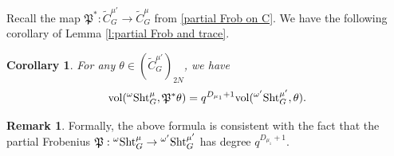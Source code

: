 \documentclass[reqno]{amsart}
\numberwithin{equation}{subsection}
\newtheorem{cor}[subsubsection]{Corollary}
\theoremstyle{definition}
\newtheorem{remark}[subsubsection]{Remark}
\newcommand\frP{\mathfrak{P}}
\newcommand\Sht{\textup{Sht}}
\newcommand{\vol}{\textup{vol}}
\newcommand{\wt}[1]{\widetilde{#1}}
\renewcommand{\th}{\theta}
\newcommand{\om}{\omega}
\begin{document}
Recall the map $\frP^*: \wt C^{\mu'}_G\to \wt C^\mu_G$ from \eqref{partial Frob on C}. 
We have the following corollary of Lemma \ref{l:partial Frob and trace}.

\begin{cor}\label{c:vol pullback partial Frob}
    For any $\th\in (\wt C^{\mu'}_G)_{2N}$, we have
\begin{equation*}
\vol({}^\omega \Sht_G^\mu, \frP^*\th) =q^{D_{\mu_1}+1} \vol({}^{\omega'} \Sht^{\mu'}_G, \th).
\end{equation*}
\end{cor}

\begin{remark}Formally, the above formula is consistent with the fact that the partial Frobenius $\frP: {}^\om\Sht^\mu_G\to {}^{\om'}\Sht^{\mu'}_G$ has degree $q^{D_{\mu_1}+1}$.
\end{remark}
\end{document}
